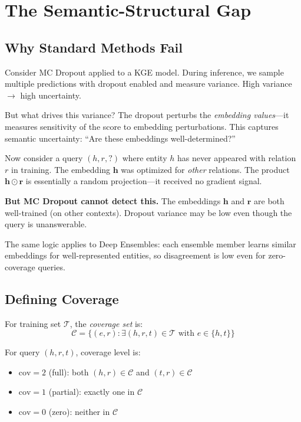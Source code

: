 \documentclass{article}
\begin{document}
\section{The Semantic-Structural Gap}
\label{sec:framework}

\subsection{Why Standard Methods Fail}

Consider MC Dropout applied to a KGE model.
During inference, we sample multiple predictions with dropout enabled and measure variance.
High variance $\rightarrow$ high uncertainty.

But what drives this variance?
The dropout perturbs the \emph{embedding values}---it measures sensitivity of the score to embedding perturbations.
This captures semantic uncertainty: ``Are these embeddings well-determined?''

Now consider a query $(h, r, ?)$ where entity $h$ has never appeared with relation $r$ in training.
The embedding $\mathbf{h}$ was optimized for \emph{other} relations.
The product $\mathbf{h} \odot \mathbf{r}$ is essentially a random projection---it received no gradient signal.

\textbf{But MC Dropout cannot detect this.}
The embeddings $\mathbf{h}$ and $\mathbf{r}$ are both well-trained (on other contexts).
Dropout variance may be low even though the query is unanswerable.

The same logic applies to Deep Ensembles: each ensemble member learns similar embeddings for well-represented entities, so disagreement is low even for zero-coverage queries.

\subsection{Defining Coverage}

For training set $\mathcal{T}$, the \emph{coverage set} is:
\[
\mathcal{C} = \{(e, r) : \exists (h, r, t) \in \mathcal{T} \text{ with } e \in \{h, t\}\}
\]

For query $(h, r, t)$, coverage level is:
\begin{itemize}
    \item $\text{cov}=2$ (full): both $(h,r) \in \mathcal{C}$ and $(t,r) \in \mathcal{C}$
    \item $\text{cov}=1$ (partial): exactly one in $\mathcal{C}$
    \item $\text{cov}=0$ (zero): neither in $\mathcal{C}$
\end{itemize}
\end{document}

